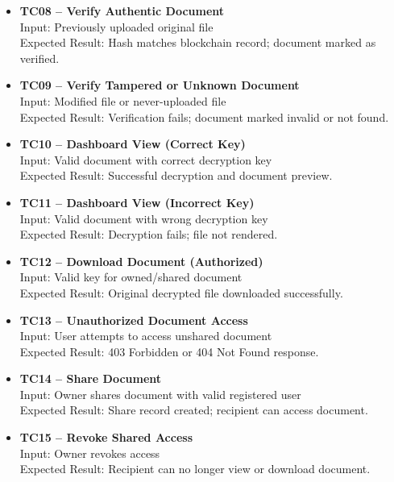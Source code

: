 \documentclass[12pt]{article}
\begin{document}
\begin{itemize}
\item \textbf{TC08 -- Verify Authentic Document} \\
Input: Previously uploaded original file \\
Expected Result: Hash matches blockchain record; document marked as verified.

\item \textbf{TC09 -- Verify Tampered or Unknown Document} \\
Input: Modified file or never-uploaded file \\
Expected Result: Verification fails; document marked invalid or not found.

\item \textbf{TC10 -- Dashboard View (Correct Key)} \\
Input: Valid document with correct decryption key \\
Expected Result: Successful decryption and document preview.

\item \textbf{TC11 -- Dashboard View (Incorrect Key)} \\
Input: Valid document with wrong decryption key \\
Expected Result: Decryption fails; file not rendered.

\item \textbf{TC12 -- Download Document (Authorized)} \\
Input: Valid key for owned/shared document \\
Expected Result: Original decrypted file downloaded successfully.

\item \textbf{TC13 -- Unauthorized Document Access} \\
Input: User attempts to access unshared document \\
Expected Result: 403 Forbidden or 404 Not Found response.

\item \textbf{TC14 -- Share Document} \\
Input: Owner shares document with valid registered user \\
Expected Result: Share record created; recipient can access document.

\item \textbf{TC15 -- Revoke Shared Access} \\
Input: Owner revokes access \\
Expected Result: Recipient can no longer view or download document.


\end{itemize}
\end{document}
